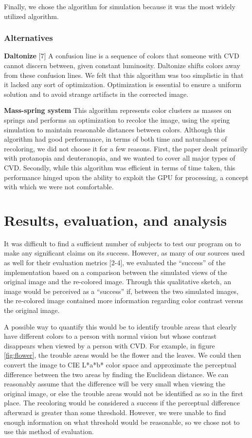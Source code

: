 \documentclass[10pt,twocolumn,letterpaper]{article}
\begin{document}
Finally, we chose the algorithm for simulation because it was the most widely utilized algorithm. 

\subsubsection{Alternatives}
\textbf{Daltonize} [7]
A confusion line is a sequence of colors that someone with CVD cannot discern between, given constant luminosity. Daltonize shifts colors away from these confusion lines. We felt that this algorithm was too simplistic in that it lacked any sort of optimization. Optimization is essential to ensure a uniform solution and to avoid strange artifacts in the corrected image. 

\textbf{Mass-spring system}
This algorithm represents color clusters as masses on springs and performs an optimization to recolor the image, using the spring simulation to maintain reasonable distances between colors. Although this algorithm had good performance, in terms of both time and naturalness of recoloring, we did not choose it for a few reasons. First, the paper dealt primarily with protanopia and deuteranopia, and we wanted to cover all major types of CVD. Secondly, while this algorithm was efficient in terms of time taken, this performance hinged upon the ability to exploit the GPU for processing, a concept with which we were not comfortable. 

\section{Results, evaluation, and analysis}

It was difficult to find a sufficient number of subjects to test our program on to make any significant claims on its success. However, as many of our sources used as well for their evaluation metrics [2-4], we evaluated the ``success'' of the implementation based on a comparison between the simulated views of the original image and the re-colored image. Through this qualitative sketch, an image would be perceived as a ``success'' if, between the two simulated images, the re-colored image contained more information regarding color contrast versus the original image. 

A possible way to quantify this would be to identify trouble areas that clearly have different colors to a person with normal vision but whose contrast disappears when viewed by a person with CVD. For example, in figure \ref{fig:flower}, the trouble areas would be the flower and the leaves. We could then convert the image to CIE L*a*b* color space and approximate the perceptual difference between the two areas by finding the Euclidean distance. We can reasonably assume that the difference will be very small when viewing the original image, or else the trouble areas would not be identified as so in the first place. The recoloring would be considered a success if the perceptual difference afterward is greater than some threshold. However, we were unable to find enough information on what threshold would be reasonable, so we chose not to use this method of evaluation. 
\end{document}
